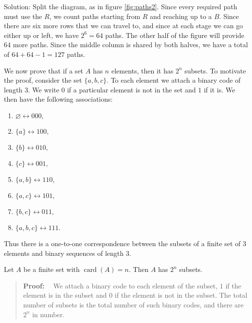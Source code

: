\documentclass[11pt, openany]{book}
\theoremstyle{change} \theoremheaderfont{\blue\sffamily\bfseries}
\newcommand{\proofsymbol}{\Pisymbol{pzd}{113}}
\theoremstyle{nonumberplain} \theoremheaderfont{\sffamily\bfseries}
\newenvironment{pf}[0]{\itshape\begin{quote}{\bf Proof: \ }}{\proofsymbol\end{quote}}
\newcommand{\í}{\'{\i}}
\def\card#1{\operatorname{card}\left(#1\right)}
\begin{document}
Solution: Split the diagram, as in figure \ref{fig:paths2}. Since
every required path must use the $R$, we count paths starting from
$R$ and reaching up to a $B$. Since there are six more rows that we
can travel to, and since at each stage we can go either up or left,
we have $2^6 = 64$ paths. The other half of the figure will provide
$64$ more paths. Since the middle column is shared by both halves,
we have a total of $64 + 64 - 1 = 127$ paths.

\bigskip

We now prove that if a set $A$ has $n$ elements, then it has $2^n$
subsets. To motivate the proof, consider the set $\{a, b, c\}$. To
each element we attach a binary code of length $3$. We write $0$ if
a particular element is not in the set and $1$ if it is.  We then
have the following associations:
\begin{multicols}{2}\columnseprule 1pt \columnsep 25pt
\begin{enumerate}
\item[] $ \varnothing \leftrightarrow 000,    $
\item[] $ \{a\} \leftrightarrow 100,    $
\item[] $ \{b\} \leftrightarrow 010,    $
\item[] $ \{c\} \leftrightarrow 001,    $
\item[] $ \{a,b\} \leftrightarrow 110,    $
\item[] $ \{a,c\} \leftrightarrow 101,    $
\item[] $ \{b,c\} \leftrightarrow 011,    $
\item[] $ \{a,b,c\} \leftrightarrow 111.    $
\end{enumerate}
\end{multicols}
Thus there is a one-to-one correspondence between the subsets of a
finite set of $3$ elements and binary sequences of length $3$.
\begin{thm}\label{thm:cardinality_of_power_set} Let $A$ be a finite set
with $\card{A} = n$. Then $A$ has $2^n$ subsets.
\end{thm}
\begin{pf}
We attach a binary code to each element of the subset, $1$ if the
element is in the subset and $0$ if the element is not in the
subset.  The total number of subsets is the total number of such
binary codes, and there are $2^n$ in number.
\end{pf}
\end{document}
